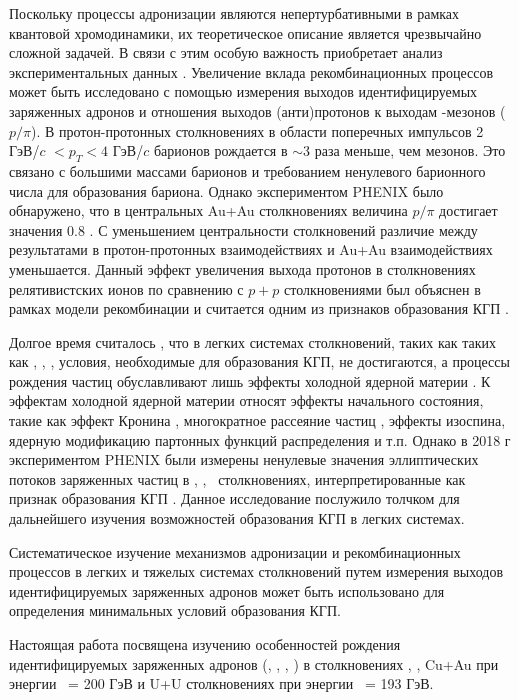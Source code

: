 Поскольку процессы адронизации являются непертурбативными в рамках квантовой хромодинамики, их теоретическое описание является чрезвычайно сложной задачей. В связи с этим особую важность приобретает анализ экспериментальных данных \autocite{nucleus2020}. Увеличение вклада рекомбинационных процессов может быть исследовано с помощью измерения выходов идентифицируемых заряженных адронов и отношения выходов (анти)протонов к выходам  \pipm-мезонов ($p/\pi$). 
В протон-протонных столкновениях в области поперечных импульсов 2 ГэВ/$c$ $<p_{T}<4$ ГэВ/$c$ барионов рождается в $\sim$3 раза меньше, чем мезонов. Это связано с большими массами барионов и требованием ненулевого барионного числа для образования бариона. Однако экспериментом PHENIX \cite{PHENIXoverview} было обнаружено, что в центральных Au+Au столкновениях величина $p/\pi$ достигает значения 0.8 \cite{p2piRatio_130GeV, p2piRatio_2003}. С уменьшением центральности столкновений различие между результатами в протон-протонных взаимодействиях и Au+Au взаимодействиях уменьшается.  
Данный эффект увеличения выхода протонов в столкновениях релятивистских ионов по сравнению с $p+p$ столкновениями был объяснен в рамках модели рекомбинации и считается одним из признаков образования КГП \cite{BaryonPuzzleHeavy, Recombination1, Recombination2}.

Долгое время считалось \cite{PHENIX_Nature,CNM}, что в легких системах столкновений, таких как таких как \pal, \heau, \dau, условия, необходимые для образования КГП, не достигаются, а процессы рождения частиц обуславливают лишь эффекты холодной ядерной материи \cite{CNM, phi_dAu, QGP_small_syst}. К эффектам холодной ядерной материи относят эффекты начального состояния, такие как эффект Кронина \cite{Cronin, Cronin_hadrons_pp_dAu_AuAu}, многократное рассеяние частиц \cite{MPI1, MPI2}, эффекты изоспина, ядерную модификацию партонных функций  распределения \cite{PDF1, PDF2} и т.п. Однако в 2018 г экспериментом PHENIX были измерены ненулевые значения эллиптических потоков заряженных частиц в \pal, \heau, \dau \ столкновениях, интерпретированные как признак образования КГП \cite{PHENIX_Nature}. Данное исследование послужило толчком для дальнейшего изучения возможностей образования КГП в легких системах. 

Систематическое изучение механизмов адронизации и рекомбинационных процессов в легких и тяжелых системах столкновений путем измерения выходов идентифицируемых заряженных адронов может быть использовано для определения минимальных условий образования КГП. 
 
Настоящая работа посвящена изучению особенностей рождения идентифицируемых заряженных адронов (\pipm, \Kpm, \prot, \aprot) в столкновениях \pal, \heau, Cu+Au при энергии \sqsn \ = 200 ГэВ и U+U столкновениях при энергии \sqsn \ = 193 ГэВ.

